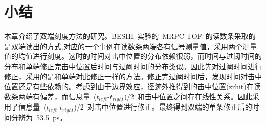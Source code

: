 \section{小结}

本章介绍了双端刻度方法的研究。BESIII~实验的~MRPC-TOF~的读数条采取的是双端读出的方式,对应的一个事例在读数条两端各有信号测量值，采用两个测量值的均值进行刻度。这时的时间对击中位置的分布依赖很弱，而时间与过阈时间的分布和单端修正完击中位置后时间与过阈时间的分布类似。因此先对过阈时间进行修正，采用的是和单端对此修正一样的方法。修正完过阈时间后，发现时间对击中位置还是有些依赖的。考虑到由于边界效应，径迹外推得到的击中位置(zrhit)在读数条两端有偏差，而信息量~($t_{left}$-$t_{right}$)/2~和击中位置之间存在线性关系。因此采用了信息量~($t_{left}$-$t_{right}$)/2~对击中位置进行修正。最终得到双端的单条修正后的时间分辨为~53.5~ps。











